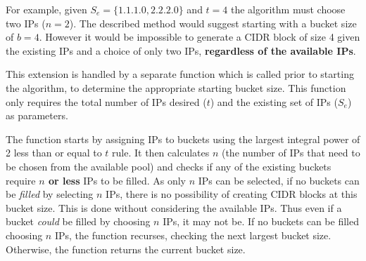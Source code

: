 \begin{appendices}
For example, given $S_e = \{1.1.1.0, 2.2.2.0\}$ and $t = 4$ the algorithm must choose two IPs ($n = 2$). The described method would suggest starting with a bucket size of $b=4$. However it would be impossible to generate a CIDR block of size 4 given the existing IPs and a choice of only two IPs, \textbf{regardless of the available IPs}. 

This extension is handled by a separate function which is called prior to starting the algorithm, to determine the appropriate starting bucket size. This function only requires the total number of IPs desired ($t$) and the existing set of IPs ($S_e$) as parameters. 

The function starts by assigning IPs to buckets using the largest integral power of 2 less than or equal to $t$ rule. It then calculates $n$ (the number of IPs that need to be chosen from the available pool) and checks if any of the existing buckets require \textbf{$n$ or less} IPs to be filled. As only $n$ IPs can be selected, if no buckets can be \textit{filled} by selecting $n$ IPs, there is no possibility of creating CIDR blocks at this bucket size. This is done without considering the available IPs. Thus even if a bucket \textit{could} be filled by choosing $n$ IPs, it may not be. If no buckets can be filled choosing $n$ IPs, the function recurses, checking the next largest bucket size. Otherwise, the function returns the current bucket size.



\end{appendices}